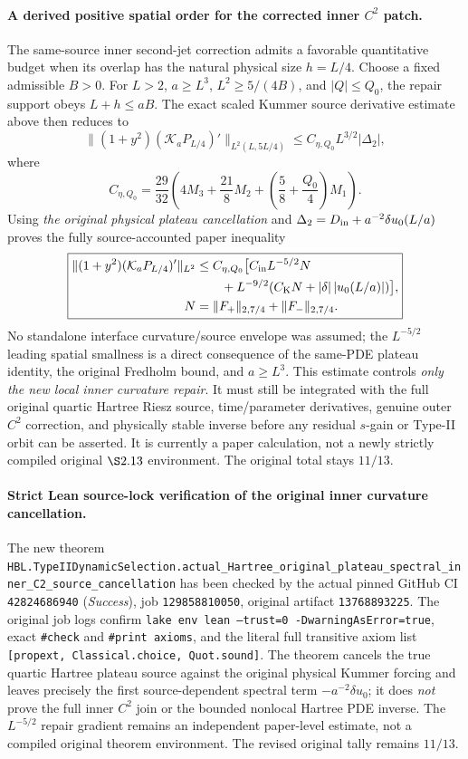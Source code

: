 \documentclass[11pt]{amsart}
\begin{document}
\paragraph{A derived positive spatial order for the corrected inner \(C^2\) patch.}
The same-source inner second-jet correction admits a favorable
quantitative budget when its overlap has the natural physical
size \(h=L/4\). Choose a fixed admissible \(B>0\).
For \(L>2\), \(a\ge L^3\),
\(L^2\ge5/(4B)\), and \(|Q|\le Q_0\),
the repair support obeys \(L+h\le aB\).
The exact scaled Kummer source derivative estimate above then
reduces to
\[
 \|(1+y^2)(\mathcal K_aP_{L/4})'\|_{L^2(L,5L/4)}
 \le C_{\eta,Q_0}L^{3/2}|\Delta_2|,
\]
where
\[
 C_{\eta,Q_0}=\frac{29}{32}
 \left(4M_3+\frac{21}{8}M_2+
       \left(\frac58+\frac{Q_0}{4}\right)M_1\right).
\]
Using \emph{the original physical plateau cancellation}
and \(\Delta_2=D_{\rm in}+a^{-2}\delta u_0(L/a)\)
proves the fully source-accounted paper inequality
\[
 \boxed{
 \begin{split}
 \|(1+y^2)(\mathcal K_aP_{L/4})'\|_{L^2}
 &\le C_{\eta,Q_0}\bigl[
 C_{\rm in}L^{-5/2}N\\
 &\qquad+L^{-9/2}
 (C_{\rm K}N+|\delta|\,|u_0(L/a)|)\bigr],\\
 N&=\|F_+\|_{2,7/4}+\|F_-\|_{2,7/4}.
 \end{split}
 }
\]
No standalone interface curvature/source envelope was assumed;
the \(L^{-5/2}\) leading spatial smallness is a direct
consequence of the same-PDE plateau identity, the
original Fredholm bound, and \(a\ge L^3\).
This estimate controls \emph{only the new local inner
curvature repair}. It must still be integrated with
the full original quartic Hartree Riesz source,
time/parameter derivatives, genuine outer \(C^2\)
correction, and physically stable inverse before
any residual \(s\)-gain or Type-II orbit can be asserted.
It is currently a paper calculation, not a newly
strictly compiled original \(\S2.13\) environment.
The original total stays \(11/13\).


\paragraph{Strict Lean source-lock verification of the original inner curvature cancellation.}
The new theorem
\texttt{HBL.TypeIIDynamicSelection.actual\_Hartree\_original\_plateau\_spectral\_inner\_C2\_source\_cancellation}
has been checked by the actual pinned GitHub CI
\texttt{42824686940} (\emph{Success}), job
\texttt{129858810050}, original artifact
\texttt{13768893225}.
The original job logs confirm \texttt{lake env lean
--trust=0 -DwarningAsError=true}, exact
\texttt{\#check} and \texttt{\#print axioms},
and the literal full transitive axiom list
\texttt{[propext, Classical.choice, Quot.sound]}.
The theorem cancels the true quartic Hartree plateau
source against the original physical Kummer forcing
and leaves precisely the first source-dependent spectral
term \(-a^{-2}\delta u_0\); it does \emph{not}
prove the full inner \(C^2\) join or the bounded
nonlocal Hartree PDE inverse. The \(L^{-5/2}\)
repair gradient remains an independent paper-level
estimate, not a compiled original theorem environment.
The revised original tally remains \(11/13\).
\end{document}

